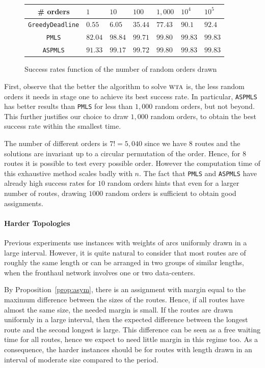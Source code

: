 \documentclass[a4paper,10pt]{article}
\newcommand\greedydeadline{\texttt{GreedyDeadline}\xspace}
\newcommand\PMLS{\texttt{PMLS}\xspace}
\newcommand\ASPMLS{\texttt{ASPMLS}\xspace}
\newcommand\wta{\textsc{wta}\xspace}
\begin{document}
         \begin{figure}[h] 
       \begin{center}
   \begin{tabularx}{0.8\textwidth}{|c|X|X|X|X|X|X|}
    \hline
    \# orders& $1$ & $10$ & $100$& $1,000$& $10^{4}$&$10^{5}$\\
    \hline
    \greedydeadline & $0.55$ &$6.05$&$35.44$&$77.43$&$90.1$&$92.4$\\
    \hline
    \PMLS & $82.04$ &$98.84$&$99.71$&$99.80$&$99.83$&$99.83$\\
    \hline
    \ASPMLS & $91.33$&$99.17$&$99.72$&$99.80$ &$99.83$&$99.83$\\
    \hline
      \end{tabularx}
      \end{center}
   \caption{Success rates function of the number of random orders drawn}
        \label{fig:randomdrawing}
     \end{figure}

	First, observe that the better the algorithm to solve $\wta$ is, the less random orders it needs in stage one to achieve its best success rate. In particular, \ASPMLS has better results than \PMLS for less than $1,000$ random orders, but not beyond. This further justifies our choice to draw $1,000$ random orders, to obtain the best success rate within the smallest time.

	The number of different orders is $7!= 5,040$ since we have $8$ routes and the solutions are invariant up to a circular permutation of the order. Hence, for $8$ routes it is possible to test every possible order. However the computation time of this exhaustive method scales badly with $n$. The fact that \PMLS and \ASPMLS have already high success rates for $10$ random orders hints that even for a larger number of routes, drawing $1000$ random orders is sufficient to obtain good assignments.


     \paragraph{Harder Topologies}
     
    Previous experiments use instances with weights of arcs uniformly drawn in a large interval. However, it is quite natural to consider that most routes are of roughly the same length or can be arranged in two groups of similar lengths, when the fronthaul network involves one or two data-centers.
    
	By Proposition~\ref{prop:asym}, there is an assignment with margin equal to the maximum difference
    between the sizes of the routes. Hence, if all routes have almost the same size, the needed margin is small. If the routes are drawn uniformly in a large interval, then the expected difference between the longest route and the second longest is large. This difference can be seen as a free waiting time for all routes, hence we expect to need little margin in this regime too. As a consequence, the harder instances should be for routes with length drawn in an interval of moderate size compared to the period.
\end{document}
